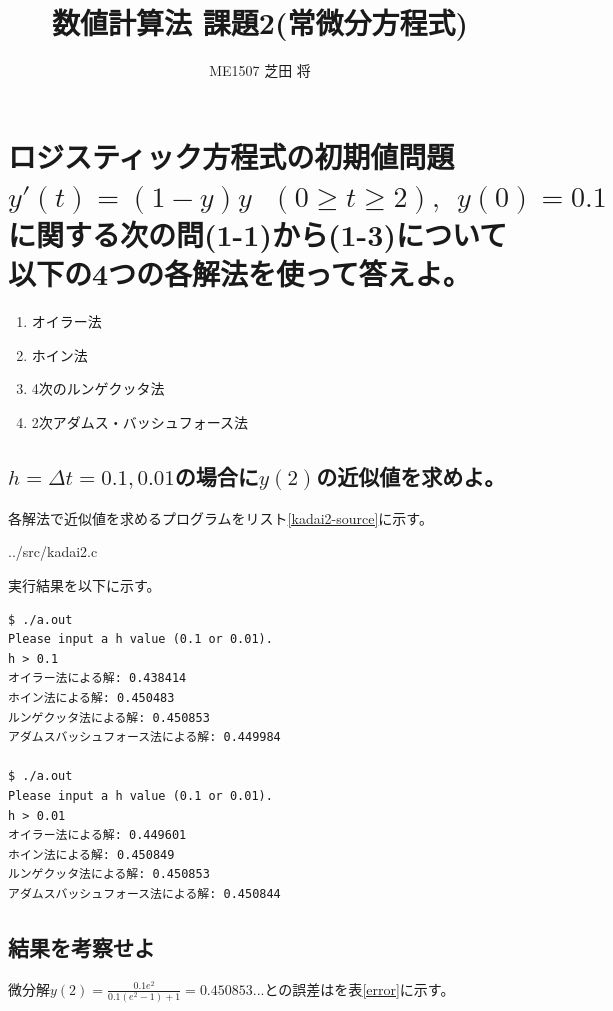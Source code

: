 \documentclass[]{jsarticle}
\title{\LARGE {数値計算法 課題2(常微分方程式)}}
\author{\large {ME1507 芝田 将}}
\begin{document}
\maketitle

\section{ロジスティック方程式の初期値問題$y'(t)=(1-y)y ~~~ (0 \ge t \ge 2),~~ y(0)=0.1$に関する次の問(1-1)から(1-3)について以下の4つの各解法を使って答えよ。}

\begin{enumerate}
\item オイラー法
\item ホイン法
\item 4次のルンゲクッタ法
\item 2次アダムス・バッシュフォース法
\end{enumerate}

\subsection{$h=\Delta t = 0.1, 0.01$の場合に$y(2)$の近似値を求めよ。}

各解法で近似値を求めるプログラムをリスト\ref{kadai2-source}に示す。


{../src/kadai2.c}


実行結果を以下に示す。

\begin{lstlisting}[caption=実行結果,label=kadai2-result]
$ ./a.out
Please input a h value (0.1 or 0.01).
h > 0.1
オイラー法による解: 0.438414
ホイン法による解: 0.450483
ルンゲクッタ法による解: 0.450853
アダムスバッシュフォース法による解: 0.449984

$ ./a.out
Please input a h value (0.1 or 0.01).
h > 0.01
オイラー法による解: 0.449601
ホイン法による解: 0.450849
ルンゲクッタ法による解: 0.450853
アダムスバッシュフォース法による解: 0.450844
\end{lstlisting}


\subsection{結果を考察せよ}

微分解$y(2) = \frac{0.1 e^{2}}{0.1 (e^{2}-1)+1} = 0.450853...$との誤差はを表\ref{error}に示す。
\end{document}
